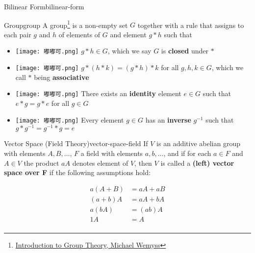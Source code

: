 \begin{Definition}{Bilinear Form}{bilinear-form}
    \begin{Definition}{Group}{group}
        A group\footnote{\href{https://www.maths.gla.ac.uk/~mwemyss/teaching/3alg1-7.pdf}{Introduction to Group Theory, Michael Wemyss}} is a non-empty set $G$ together with a rule that assigns to each pair $g$ and $h$ of elements of $G$
        and element $g * h$ such that
        \begin{itemize}
            \item[] \texttt{[image: 嘟嘟可.png]}  $g * h \in G$, which we say $G$ is \textbf{closed} under $*$
            \item[] \texttt{[image: 嘟嘟可.png]} $g * (h * k) = (g * h) * k$ for all $g, h, k \in G$, which we call $*$ being
            \textbf{associative}
            \item[] \texttt{[image: 嘟嘟可.png]} There exists an \textbf{identity} element $e \in G$ such that $e * g = g * e$ for all
            $g \in G$
            \item[] \texttt{[image: 嘟嘟可.png]} Every element $g \in G$ has an \textbf{inverse} $g^{-1}$ such that
            $g * g^{-1} = g^{-1} * g = e$
        \end{itemize}
    \end{Definition}

    \begin{Definition}{Vector Space (Field Theory)}{vector-space-field}
        If $V$ is an additive abelian group with elements $A, B, \ldots$, $F$ a field with elements $a, b, \dots$, and if
        for each $a \in F$ and $A \in V$ the product $aA$ denotes element of $V$, then $V$ is called a
        \textbf{(left) vector space over F} if the following assumptions hold:

        \begin{align}
            a(A + B) &= aA + aB \\
            (a + b)A &= aA + bA \\
            a(bA) &= (ab)A \\
            1A &= A \\
        \end{align}
    \end{Definition}
\end{Definition}
